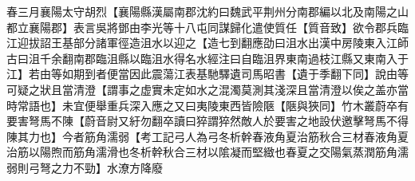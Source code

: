春三月襄陽太守胡烈【襄陽縣漢屬南郡沈約曰魏武平荆州分南郡編以北及南陽之山都立襄陽郡】表言吳將鄧由李光等十八屯同謀歸化遣使質任【質音致】欲令郡兵臨江迎拔詔王基部分諸軍徑造沮水以迎之【造七到翻應劭曰沮水出漢中房陵東入江師古曰沮千余翻南郡臨沮縣以臨沮水得名水經注曰自臨沮界東南過枝江縣又東南入于江】若由等如期到者便當因此震蕩江表基馳驛遺司馬昭書【遺于季翻下同】說由等可疑之狀且當清澄【謂事之虚實未定如水之混濁莫測其淺深且當清澄以俟之盖亦當時常語也】未宜便舉重兵深入應之又曰夷陵東西皆險陿【陿與狹同】竹木叢蔚卒有要害弩馬不陳【蔚音尉又紆勿翻卒讀曰猝謂猝然敵人於要害之地設伏邀擊弩馬不得陳其力也】今者筋角濡弱【考工記弓人為弓冬析幹春液角夏治筋秋合三材春液角夏治筋以陽煦而筋角濡滑也冬析幹秋合三材以隂凝而堅緻也春夏之交陽氣蒸潤筋角濡弱則弓弩之力不勁】水潦方降廢